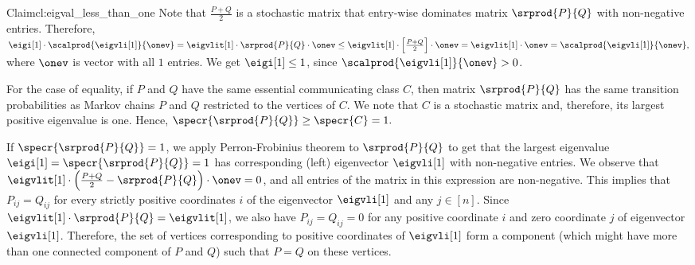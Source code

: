 \begin{prevproof}{Claim}{cl:eigval_less_than_one}
	Note that $\frac{P+Q}{2}$ is a stochastic matrix that 
	entry-wise dominates matrix $\srprod{P}{Q}$ with non-negative entries. Therefore,
	$
	\eigi[1]\cdot\scalprod{\eigvli[1]}{\onev}=\eigvlit[1]\circ\srprod{P}{Q}\circ\onev\le\eigvlit[1]\circ\left[\frac{P+Q}{2}\right]\circ\onev
	=\eigvlit[1]\circ\onev=\scalprod{\eigvli[1]}{\onev},
	$
	where $\onev$ is vector with all $1$ entries. We get $\eigi[1]\le 1$, since $\scalprod{\eigvli[1]}{\onev}>0$.
	
	For the case of equality, if $P$ and $Q$ have the same essential communicating class $C$, then matrix $\srprod{P}{Q}$ has the same transition 
	probabilities as Markov chains $P$ and $Q$ restricted to the vertices of $C$. We note that $C$ is a stochastic 
	matrix and, therefore, its largest positive eigenvalue is one. Hence, $\specr{\srprod{P}{Q}}\ge\specr{C} = 1.$
	
	If $\specr{\srprod{P}{Q}}=1$, we apply Perron-Frobinius theorem to $\srprod{P}{Q}$ to get  
	that the largest eigenvalue $\eigi[1]=\specr{\srprod{P}{Q}}=1$ has corresponding (left) eigenvector $\eigvli[1]$ with non-negative entries. 
	We observe that $\eigvlit[1]\circ\left(\frac{P+Q}{2}-\srprod{P}{Q}\right)\circ\onev=0$, 
	and all entries of the matrix in this expression are non-negative. This implies that $P_{ij}=Q_{ij}$ for every strictly positive coordinates 
	$i$ of the eigenvector $\eigvli[1]$ and any $j\in[n]$. Since $\eigvlit[1]\circ\srprod{P}{Q}=\eigvlit[1]$, we also have $P_{ij}=Q_{ij}=0$ for any positive 
	coordinate $i$ and zero coordinate $j$ of eigenvector $\eigvli[1]$. Therefore, the set of vertices corresponding to positive coordinates of $\eigvli[1]$ 
	form a component (which might have more than one connected component of $P$ and $Q$) such that $P=Q$ on these vertices.  
\end{prevproof}


